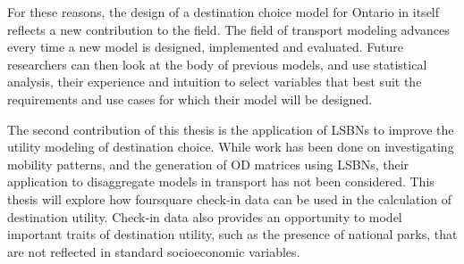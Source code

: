 For these reasons, the design of a destination choice model for Ontario in itself reflects a new contribution to the field.  The field of transport modeling advances every time a new model is designed, implemented and evaluated. Future researchers can then look at the body of previous models, and use statistical analysis, their experience and intuition to select variables that best suit the requirements and use cases for which their model will be designed. 

The second contribution of this thesis is the application of LSBNs to improve the utility modeling of destination choice. While work has been done on investigating mobility patterns, and the generation of OD matrices using LSBNs, their application to disaggregate models in transport has not been considered. This thesis will explore how foursquare check-in data can be used in the calculation of destination utility. Check-in data also provides an opportunity to model important traits of destination utility, such as the presence of national parks, that are not reflected in standard socioeconomic variables.

